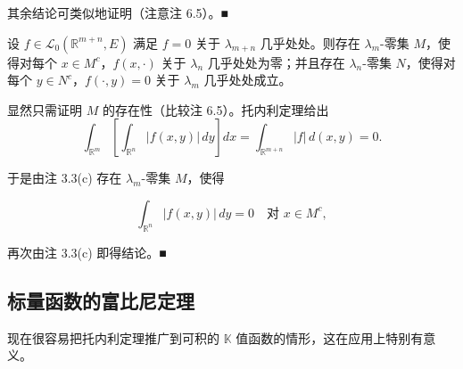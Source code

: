 \begin{theorem}
\begin{subitems}
其余结论可类似地证明（注意注 6.5）。\nobreak\hspace{0.35em}■

\end{subitems}

\end{theorem}

\begin{corollary}

设 $ f \in \mathcal{L}_{0}(\mathbb{R}^{m+n}, E) $ 满足 $ f = 0 $ 关于 $ \lambda_{m+n} $ 几乎处处。则存在 $ \lambda_m $-零集 $ M $，使得对每个 $ x \in M^{c} $，$ f(x, \cdot) $ 关于 $ \lambda_n $ 几乎处处为零；并且存在 $ \lambda_n $-零集 $ N $，使得对每个 $ y \in N^{c} $，$ f(\cdot, y) = 0 $ 关于 $ \lambda_m $ 几乎处处成立。

\proofhead
显然只需证明 $ M $ 的存在性（比较注 6.5）。托内利定理给出
\[
\int_{\mathbb{R}^m} \left[ \int_{\mathbb{R}^n} |f(x, y)| \, dy \right] dx = \int_{\mathbb{R}^{m+n}} |f| \, d(x, y) = 0 .
\]

于是由注 3.3(c) 存在 $ \lambda_m $-零集 $ M $，使得

\[
\int_{\mathbb{R}^n} |f(x, y)| \, dy = 0 \quad \text{对 } x \in M^{c} ,
\]

再次由注 3.3(c) 即得结论。\nobreak\hspace{0.35em}■

\end{corollary}

\subsection*{标量函数的富比尼定理}

现在很容易把托内利定理推广到可积的 $ \mathbb{K} $ 值函数的情形，这在应用上特别有意义。


